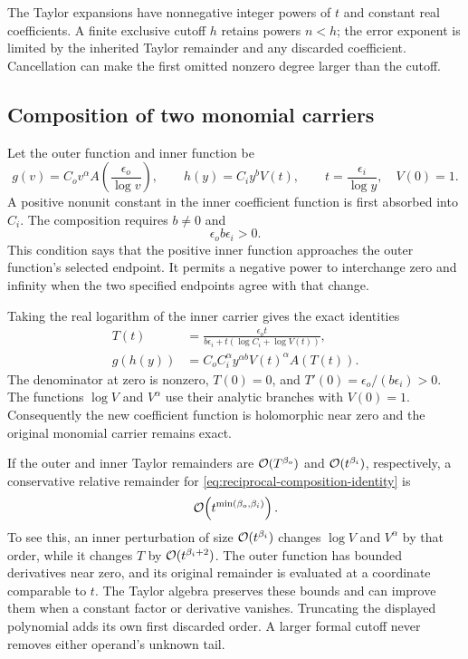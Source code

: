 The Taylor expansions have nonnegative integer powers of $t$ and constant real
coefficients. A finite exclusive cutoff $h$ retains powers $n<h$; the
error exponent is limited by the inherited Taylor remainder and any
discarded coefficient. Cancellation can make the first omitted nonzero
degree larger than the cutoff.

\subsection{Composition of two monomial carriers}

Let the outer function and inner function be
\[
 g(v)=C_o v^\alpha A\!\left(\frac{\epsilon_o}{\log v}\right),
 \qquad h(y)=C_i y^b V(t),\qquad
 t=\frac{\epsilon_i}{\log y},\quad V(0)=1.
\]
A positive nonunit constant in the inner coefficient function is first
absorbed into $C_i$. The composition requires $b\ne0$ and
\begin{equation}
 \epsilon_o b\epsilon_i>0.
 \label{eq:reciprocal-composition-endpoints}
\end{equation}
This condition says that the positive inner function approaches the outer
function's selected endpoint. It permits a negative power to interchange
zero and infinity when the two specified endpoints agree with that change.

Taking the real logarithm of the inner carrier gives the exact identities
\begin{align}
 T(t)&=\frac{\epsilon_o t}
 {b\epsilon_i+t(\log C_i+\log V(t))},
 \label{eq:reciprocal-composed-coordinate}\\
 g(h(y))&=C_o C_i^\alpha y^{\alpha b}
       V(t)^\alpha A(T(t)).
 \label{eq:reciprocal-composition-identity}
\end{align}
The denominator at zero is nonzero, $T(0)=0$, and
$T'(0)=\epsilon_o/(b\epsilon_i)>0$. The functions $\log V$ and
$V^\alpha$ use their analytic branches with $V(0)=1$. Consequently the
new coefficient function is holomorphic near zero and the original
monomial carrier remains exact.

If the outer and inner Taylor remainders are
$\mathcal O(T^{\beta_o})$ and $\mathcal O(t^{\beta_i})$, respectively, a conservative
relative remainder for \eqref{eq:reciprocal-composition-identity} is
\begin{equation}
 \mathcal O\!\left(t^{\min(\beta_o,\beta_i)}\right).
 \label{eq:reciprocal-composition-error}
\end{equation}
To see this, an inner perturbation of size $\mathcal O(t^{\beta_i})$ changes
$\log V$ and $V^\alpha$ by that order, while it changes $T$ by
$\mathcal O(t^{\beta_i+2})$. The outer function has bounded derivatives near
zero, and its original remainder is evaluated at a coordinate comparable
to $t$. The Taylor algebra preserves these bounds and can improve them when
a constant factor or derivative vanishes.
Truncating the displayed polynomial adds its own first discarded order.
A larger formal cutoff never removes either operand's unknown tail.

